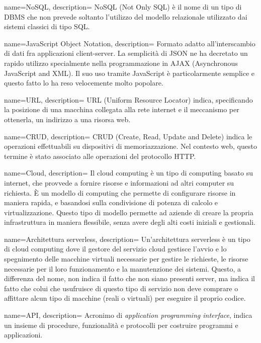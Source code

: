  {
  name=NoSQL,
  description={
NoSQL (Not Only SQL) è il nome di un tipo di DBMS che non prevede soltanto
l'utilizzo del modello relazionale utilizzato dai sistemi classici di tipo SQL.
}
}

 {
  name=JavaScript Object Notation,
  description={
Formato adatto all’interscambio di dati fra applicazioni client-server. La
semplicità di JSON ne ha decretato un rapido utilizzo specialmente nella
programmazione in AJAX (Asynchronous JavaScript and XML). Il suo uso tramite
JavaScript è particolarmente semplice e questo fatto lo ha reso velocemente
molto popolare.
}
}

 {
  name=URL,
  description={
URL (Uniform Resource Locator) indica, specificando la posizione di una macchina
collegata alla rete internet e il meccanismo per ottenerla, un indirizzo a una
risorsa web.
}
}

 {
  name=CRUD,
  description={
CRUD (Create, Read, Update and Delete) indica le operazioni effettuabili su
dispositivi di memoriazzazione. Nel contesto web, questo termine è stato
associato alle operazioni del protocollo HTTP.
}
}

 {
  name=Cloud,
  description={
Il cloud computing è un tipo di computing basato su internet, che provvede a
fornire risorse e informazioni ad altri computer su richiesta. È un modello di
computing che permette di configurare risorse in maniera rapida, e basandosi
sulla condivisione di potenza di calcolo e virtualizzazione. Questo tipo di
modello permette ad aziende di creare la propria infrastruttura in maniera
flessibile, senza avere degli alti costi iniziali e gestionali.
}
}

 {
  name=Architettura serverless,
  description={
Un'architettura serverless è un tipo di cloud computing dove il gestore del
servizio cloud gestisce l'avvio e lo spegnimento delle macchine virtuali
necessarie per gestire le richieste, le risorse necessarie per il loro
funzionamento e la manutenzione dei sistemi. Questo, a differenza del nome, non
indica il fatto che non siano presenti server, ma indica il fatto che colui che
usufruisce di questo tipo di servizio non deve comprare o affittare alcun tipo
di macchine (reali o virtuali) per eseguire il proprio codice.
}
}

 {
  name=API,
  description={
Acronimo di \textit{application programming interface}, indica un insieme
di procedure, funzionalità e protocolli per costruire programmi e applicazioni.
}
}


